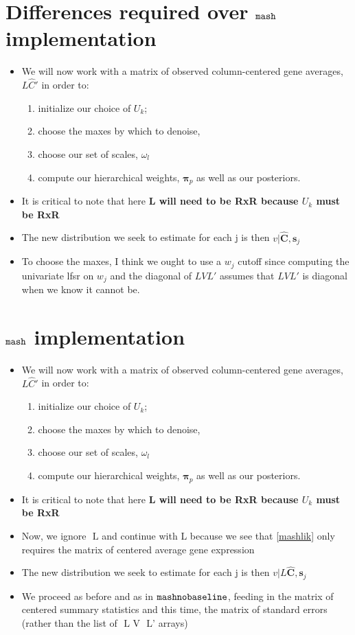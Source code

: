 \documentclass[11pt, oneside]{article}   	%
\newcommand{\chat}{\bm{\hat{C}}}
\def\lstar{\text{ L}}
\def\mash{{\tt mash}}
\def\mnb{{\tt mashnobaseline}}
\begin{document}
\begin{itemize}
\section{Differences required over $\mash$ implementation}

\begin{itemize}
\item We will now work with a matrix of observed column-centered gene averages, $L \hat{C} '$ in order to:
\begin{enumerate}
	\item initialize our choice of $U_{k}$;
	\item  choose the maxes by which to denoise, 
	\item choose our set of scales, $\omega_{l}$
	\item compute our hierarchical weights, $\bm{\pi}_{p}$ as well as our posteriors. 
\end{enumerate}
\item It is critical to note that here \textbf{L will need to be RxR because $U_{k}$ must be RxR}
\item The new distribution we seek to estimate for each j is then $v | $\lstar$ \chat , \bm{s}_{j}$
\item To choose the maxes, I think we ought to use a $w_{j}$ cutoff since computing the univariate lfsr on $w_{j}$ and the diagonal of $LVL'$ assumes that $LVL'$ is diagonal when we know it cannot be.
\end{itemize}

\section{ $\mash$ implementation}

\begin{itemize}
\item We will now work with a matrix of observed column-centered gene averages, $L \hat{C} '$ in order to:
\begin{enumerate}
	\item initialize our choice of $U_{k}$;
	\item  choose the maxes by which to denoise, 
	\item choose our set of scales, $\omega_{l}$
	\item compute our hierarchical weights, $\bm{\pi}_{p}$ as well as our posteriors. 
\end{enumerate}
\item It is critical to note that here \textbf{L will need to be RxR because $U_{k}$ must be RxR}
\item Now, we ignore $\lstar$ and continue with L because we see that \ref{mashlik} only requires the matrix of centered average gene expression
\item The new distribution we seek to estimate for each j is then $v | L \chat , \bm{s}_{j}$
\item We proceed as before and as in $\mnb$, feeding in the matrix of centered summary statistics and this time, the matrix of standard errors (rather than the list of $\lstar$ V $\lstar$' arrays)
\end{itemize}


\end{itemize}
\end{document}
